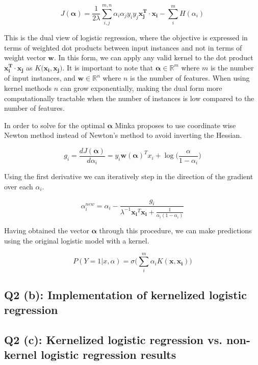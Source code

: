 \documentclass[11pt]{amsart}
\newcommand{\vek}[1]{\mathbf{#1}}
\begin{document}
\begin{equation}
J(\vek{\alpha}) = \frac{1}{2\lambda}\sum_{i,j}^{m,n}\alpha_{i}\alpha_{j}y_{i}y_{j}\vek{x_{j}^{T}\cdot x_{i}} - \sum_{i}^{m}H(\alpha_i)
\end{equation}

This is the dual view of logistic regression, where the objective is expressed in terms of weighted dot products between input instances and not in terms of weight vector $\vek{w}$. In this form, we can apply any valid kernel to the dot product $\vek{x_i^T\cdot x_j}$ as $K(\vek{x_i, x_j)}$. It is important to note that $\vek{\alpha} \in \mathbb{R}^m$ where $m$ is the number of input instances, and $\vek{w} \in \mathbb{R}^n$ where $n$ is the number of features. When using kernel methods $n$ can grow exponentially, making the dual form more computationally tractable when the number of instances is low compared to the number of features. 

In order to solve for the optimal $\vek{\alpha}$ Minka proposes to use coordinate wise Newton method instead of Newton's method to avoid inverting the Hessian. 

\begin{equation}
g_i = \frac{dJ(\vek{\alpha})}{d\alpha_i} = y_i\vek{w(\alpha)}^T x_i + \log \bigg(\frac{\alpha}{1-\alpha_i}\bigg)
\end{equation}

Using the first derivative we can iteratively step in the direction of the gradient over each $\alpha_i$.

\begin{equation}
\alpha_i^{new} = \alpha_i - \frac{g_i}{\lambda^{-1}\vek{x_i}^T\vek{x_i} + \frac{1}{\alpha_i(1-\alpha_i)}}
\end{equation}

Having obtained the vector $\vek{\alpha}$ through this procedure, we can make predictions using the original logistic model with a kernel.

\begin{equation}
P(Y=1 \vert x, \alpha) = \sigma\bigg(\sum_i^{m} \alpha_i K(\vek{x}, \vek{x_i})\bigg)
\end{equation}


\subsection{Q2 (b): Implementation of kernelized logistic regression}


\subsection{Q2 (c): Kernelized logistic regression vs. non-kernel logistic regression results}
\end{document}
